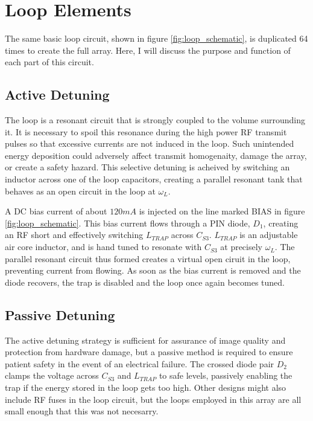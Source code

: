 \chapter{Loop Elements}

The same basic loop circuit, shown in figure \ref{fig:loop_schematic}, is duplicated 64 times to create the full array.
Here, I will discuss the purpose and function of each part of this circuit.

\section{Active Detuning}
The loop is a resonant circuit that is strongly coupled to the volume surrounding it. It is necessary to spoil this
resonance during the high power RF transmit pulses so that excessive currents are not induced in the loop. Such
unintended energy deposition could adversely affect transmit homogenaity, damage the array, or create a safety hazard.
This selective detuning is acheived by switching an inductor across one of the loop capacitors, creating a parallel
resonant tank that behaves as an open circuit in the loop at $\omega_L$.

A DC bias current of about $120mA$ is injected on the line marked BIAS in figure \ref{fig:loop_schematic}. This bias
current flows through a PIN diode, $D_1$, creating an RF short and effectively switching $L_{TRAP}$ across $C_{S3}$.
$L_{TRAP}$ is an adjustable air core inductor, and is hand tuned to resonate with $C_{S3}$ at precisely $\omega_L$. The 
parallel resonant circuit thus formed creates a virtual open ciruit in the loop, preventing current from flowing. As 
soon as the bias current is removed and the diode recovers, the trap is disabled and the loop once again becomes tuned.

\section{Passive Detuning}
The active detuning strategy is sufficient for assurance of image quality and protection from hardware damage, but a
passive method is required to ensure patient safety in the event of an electrical failure. The crossed diode pair $D_2$
clamps the voltage across $C_{S3}$ and $L_{TRAP}$ to safe levels, passively enabling the trap if the energy stored in
the loop gets too high. Other designs might also include RF fuses in the loop circuit, but the loops employed in this
array are all small enough that this was not necesarry.

